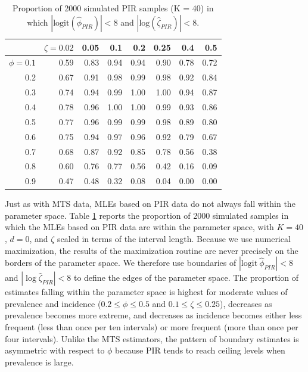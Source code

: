 \documentclass[man, noextraspace, floatsintext]{apa6}\usepackage[]{graphicx}\usepackage[]{color}
\newcommand{\logit}{\text{logit}}
\begin{document}
\begin{table}[b]
\centering
\caption{Proportion of 2000 simulated PIR samples (K = 40) in which  $|\text{logit}(\hat\phi_{PIR})| < 8$ and $|\text{log}(\hat\zeta_{PIR})| < 8$.} 
\label{tab:PIR_ests_valid}
\begin{tabular}{rrrrrrrr}
  \hline
 & $\zeta = 0.02$ & 0.05 & 0.1 & 0.2 & 0.25 & 0.4 & 0.5 \\ 
  \hline
$\phi = 0.1$ & 0.59 & 0.83 & 0.94 & 0.94 & 0.90 & 0.78 & 0.72 \\ 
  0.2 & 0.67 & 0.91 & 0.98 & 0.99 & 0.98 & 0.92 & 0.84 \\ 
  0.3 & 0.74 & 0.94 & 0.99 & 1.00 & 1.00 & 0.94 & 0.87 \\ 
  0.4 & 0.78 & 0.96 & 1.00 & 1.00 & 0.99 & 0.93 & 0.86 \\ 
  0.5 & 0.77 & 0.96 & 0.99 & 0.99 & 0.98 & 0.89 & 0.80 \\ 
  0.6 & 0.75 & 0.94 & 0.97 & 0.96 & 0.92 & 0.79 & 0.67 \\ 
  0.7 & 0.68 & 0.87 & 0.92 & 0.85 & 0.78 & 0.56 & 0.38 \\ 
  0.8 & 0.60 & 0.76 & 0.77 & 0.56 & 0.42 & 0.16 & 0.09 \\ 
  0.9 & 0.47 & 0.48 & 0.32 & 0.08 & 0.04 & 0.00 & 0.00 \\ 
   \hline
\end{tabular}
\end{table}


Just as with MTS data, MLEs based on PIR data do not always fall within the parameter space. 
Table \ref{tab:PIR_ests_valid} reports the proportion of 2000 simulated samples in which the MLEs based on PIR data are within the parameter space, with $K = 40$, $d = 0$, and $\zeta$ scaled in terms of the interval length.
Because we use numerical maximization, the results of the maximization routine are never precisely on the borders of the parameter space. 
We therefore use boundaries of $|\logit \ \hat\phi_{PIR}| < 8$ and $|\log \hat\zeta_{PIR}| < 8$ to define the edges of the parameter space. 
The proportion of estimates falling within the parameter space is highest for moderate values of prevalence and incidence ($0.2 \leq \phi \leq 0.5$ and $0.1 \leq \zeta \leq 0.25$), decreases as prevalence becomes more extreme, and decreases as incidence becomes either less frequent (less than once per ten intervals) or more frequent (more than once per four intervals).  
Unlike the MTS estimators, the pattern of boundary estimates is asymmetric with respect to $\phi$ because PIR tends to reach ceiling levels when prevalence is large. 
\end{document}
